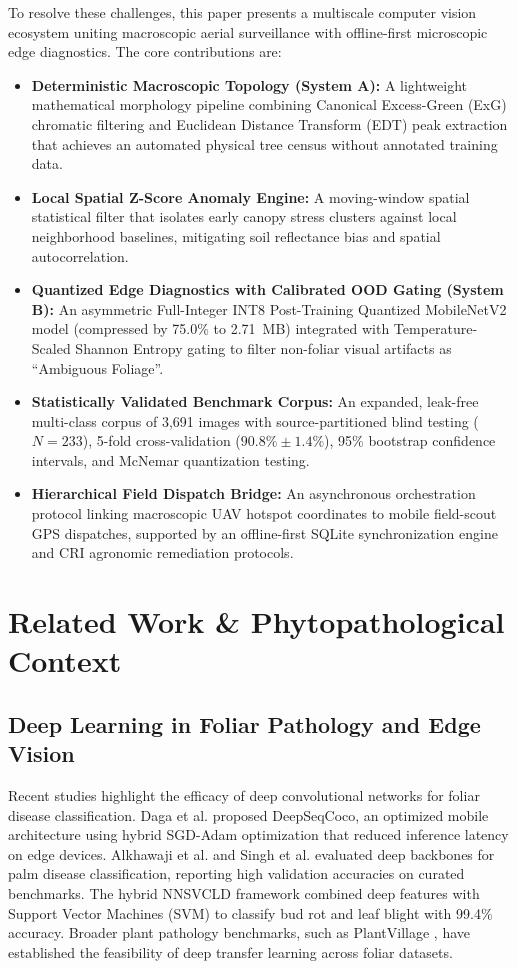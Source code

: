 \documentclass[conference,a4paper]{IEEEtran}
\begin{document}
To resolve these challenges, this paper presents a multiscale computer vision ecosystem uniting macroscopic aerial surveillance with offline-first microscopic edge diagnostics. The core contributions are:
\begin{itemize}
    \setlength{\itemsep}{0pt}\setlength{\parskip}{0pt}
    \item \textbf{Deterministic Macroscopic Topology (System A):} A lightweight mathematical morphology pipeline combining Canonical Excess-Green (ExG) chromatic filtering and Euclidean Distance Transform (EDT) peak extraction that achieves an automated physical tree census without annotated training data.
    \item \textbf{Local Spatial Z-Score Anomaly Engine:} A moving-window spatial statistical filter that isolates early canopy stress clusters against local neighborhood baselines, mitigating soil reflectance bias and spatial autocorrelation.
    \item \textbf{Quantized Edge Diagnostics with Calibrated OOD Gating (System B):} An asymmetric Full-Integer INT8 Post-Training Quantized MobileNetV2 model (compressed by 75.0\% to 2.71~MB) integrated with Temperature-Scaled Shannon Entropy gating to filter non-foliar visual artifacts as ``Ambiguous Foliage''.
    \item \textbf{Statistically Validated Benchmark Corpus:} An expanded, leak-free multi-class corpus of 3,691 images with source-partitioned blind testing ($N=233$), 5-fold cross-validation ($90.8\% \pm 1.4\%$), 95\% bootstrap confidence intervals, and McNemar quantization testing.
    \item \textbf{Hierarchical Field Dispatch Bridge:} An asynchronous orchestration protocol linking macroscopic UAV hotspot coordinates to mobile field-scout GPS dispatches, supported by an offline-first SQLite synchronization engine and CRI agronomic remediation protocols.
\end{itemize}

\section{Related Work \& Phytopathological Context}

\subsection{Deep Learning in Foliar Pathology and Edge Vision}
Recent studies highlight the efficacy of deep convolutional networks for foliar disease classification. Daga et al. \cite{b1} proposed DeepSeqCoco, an optimized mobile architecture using hybrid SGD-Adam optimization that reduced inference latency on edge devices. Alkhawaji et al. \cite{b9} and Singh et al. \cite{b10} evaluated deep backbones for palm disease classification, reporting high validation accuracies on curated benchmarks. The hybrid NNSVCLD framework \cite{b3} combined deep features with Support Vector Machines (SVM) to classify bud rot and leaf blight with 99.4\% accuracy. Broader plant pathology benchmarks, such as PlantVillage \cite{b21}, have established the feasibility of deep transfer learning across foliar datasets.
\end{document}
